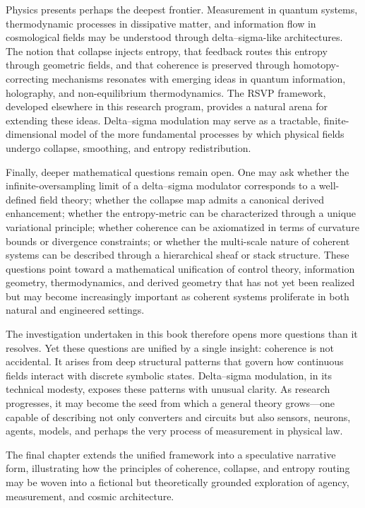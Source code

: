 Physics presents perhaps the deepest frontier. Measurement in quantum systems, thermodynamic processes in dissipative matter, and information flow in cosmological fields may be understood through delta–sigma-like architectures. The notion that collapse injects entropy, that feedback routes this entropy through geometric fields, and that coherence is preserved through homotopy-correcting mechanisms resonates with emerging ideas in quantum information, holography, and non-equilibrium thermodynamics. The RSVP framework, developed elsewhere in this research program, provides a natural arena for extending these ideas. Delta–sigma modulation may serve as a tractable, finite-dimensional model of the more fundamental processes by which physical fields undergo collapse, smoothing, and entropy redistribution.

Finally, deeper mathematical questions remain open. One may ask whether the infinite-oversampling limit of a delta–sigma modulator corresponds to a well-defined field theory; whether the collapse map admits a canonical derived enhancement; whether the entropy-metric can be characterized through a unique variational principle; whether coherence can be axiomatized in terms of curvature bounds or divergence constraints; or whether the multi-scale nature of coherent systems can be described through a hierarchical sheaf or stack structure. These questions point toward a mathematical unification of control theory, information geometry, thermodynamics, and derived geometry that has not yet been realized but may become increasingly important as coherent systems proliferate in both natural and engineered settings.

The investigation undertaken in this book therefore opens more questions than it resolves. Yet these questions are unified by a single insight: coherence is not accidental. It arises from deep structural patterns that govern how continuous fields interact with discrete symbolic states. Delta–sigma modulation, in its technical modesty, exposes these patterns with unusual clarity. As research progresses, it may become the seed from which a general theory grows—one capable of describing not only converters and circuits but also sensors, neurons, agents, models, and perhaps the very process of measurement in physical law.

The final chapter extends the unified framework into a speculative narrative form, illustrating how the principles of coherence, collapse, and entropy routing may be woven into a fictional but theoretically grounded exploration of agency, measurement, and cosmic architecture.

